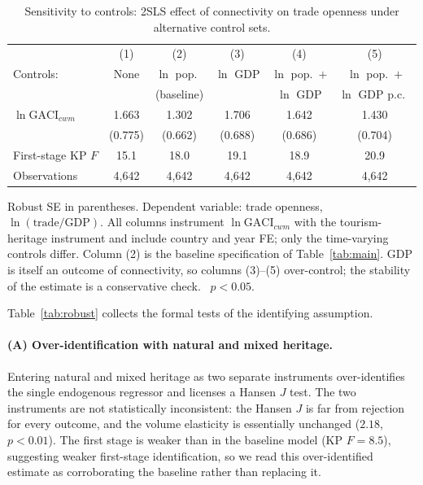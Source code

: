 \begin{table}[H]
\centering
\caption{Sensitivity to controls: 2SLS effect of connectivity on trade
openness under alternative control sets.}
\label{tab:controls}
\begin{threeparttable}
\small
\begin{tabular}{lccccc}
\toprule
 & (1) & (2) & (3) & (4) & (5) \\
Controls: & None & $\ln$ pop.\ & $\ln$ GDP & $\ln$ pop.\ $+$ & $\ln$ pop.\ $+$ \\
 & & (baseline) & & $\ln$ GDP & $\ln$ GDP p.c.\ \\
\midrule
$\ln\mathrm{GACI}_{cwm}$ & 1.663\sym{**} & 1.302\sym{**} & 1.706\sym{**} & 1.642\sym{**} & 1.430\sym{**} \\
 & (0.775) & (0.662) & (0.688) & (0.686) & (0.704) \\
\midrule
First-stage KP $F$ & 15.1 & 18.0 & 19.1 & 18.9 & 20.9 \\
Observations & 4{,}642 & 4{,}642 & 4{,}642 & 4{,}642 & 4{,}642 \\
\bottomrule
\end{tabular}
\begin{tablenotes}\footnotesize
\item Robust SE in parentheses. Dependent variable: trade openness,
$\ln(\text{trade}/\text{GDP})$. All columns instrument $\ln\mathrm{GACI}_{cwm}$
with the tourism-heritage instrument and include country and year FE; only the
time-varying controls differ. Column (2) is the baseline specification of
Table~\ref{tab:main}. GDP is itself an outcome of connectivity, so columns
(3)--(5) over-control; the stability of the estimate is a conservative check.
\sym{**}~$p<0.05$.
\end{tablenotes}
\end{threeparttable}
\end{table}

Table~\ref{tab:robust} collects the formal tests of the identifying assumption.

\paragraph{(A) Over-identification with natural and mixed heritage.} Entering
natural and mixed heritage as two separate instruments over-identifies
the single endogenous regressor and licenses a Hansen $J$ test. The two
instruments are not statistically inconsistent: the Hansen $J$ is far from
rejection for every outcome, and the volume
elasticity is essentially unchanged ($2.18$, $p<0.01$). The first stage is
weaker than in the baseline model (KP $F=8.5$), suggesting weaker first-stage
identification, so we read this over-identified estimate as corroborating the
baseline rather than replacing it.

